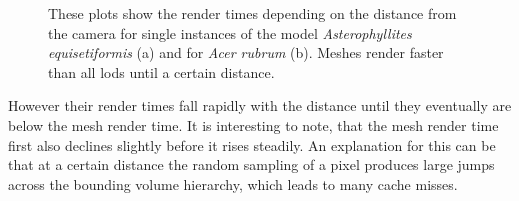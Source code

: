 \begin{figure}[ht]
\begin{subfigure}[b]{0.45\linewidth}
        \caption{}
    \end{subfigure}
	\caption[Plots of the render times depending on the distance from the camera.]{These plots show the render times depending on the distance from the camera for single instances of the model \textit{Asterophyllites equisetiformis} (a) and for \textit{Acer rubrum} (b). Meshes render faster than all \acsp{lod} until a certain distance.}
	\label{fig:render_time_comparisons}
\end{figure}
However their render times fall rapidly with the distance until they eventually are below the mesh render time.
It is interesting to note, that the mesh render time first also declines slightly before it rises steadily.
An explanation for this can be that at a certain distance the random sampling of a pixel produces large jumps across the bounding volume hierarchy, which leads to many cache misses.

